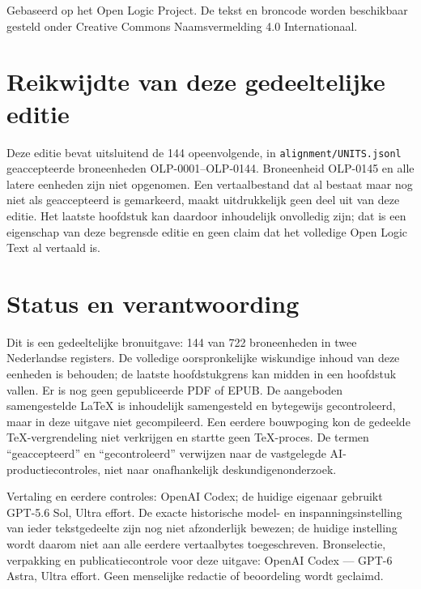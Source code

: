 \documentclass[openany]{memoir}
\begin{document}
\begin{titlingpage}
\vfill
\noindent Gebaseerd op het Open Logic Project. De tekst en broncode worden
beschikbaar gesteld onder Creative Commons Naamsvermelding 4.0 Internationaal.
\end{titlingpage}
\chapter*{Reikwijdte van deze gedeeltelijke editie}
Deze editie bevat uitsluitend de 144 opeenvolgende,
in \texttt{alignment/UNITS.jsonl} geaccepteerde broneenheden OLP-0001--OLP-0144.
Broneenheid OLP-0145 en alle latere eenheden zijn niet opgenomen.
Een vertaalbestand dat al bestaat maar nog niet als geaccepteerd is gemarkeerd,
maakt uitdrukkelijk geen deel uit van deze editie. Het laatste hoofdstuk kan
daardoor inhoudelijk onvolledig zijn; dat is een eigenschap van deze begrensde
editie en geen claim dat het volledige Open Logic Text al vertaald is.
\chapter*{Status en verantwoording}
Dit is een gedeeltelijke bronuitgave: 144 van 722 broneenheden in twee Nederlandse registers. De volledige oorspronkelijke wiskundige inhoud van deze eenheden is behouden; de laatste hoofdstukgrens kan midden in een hoofdstuk vallen. Er is nog geen gepubliceerde PDF of EPUB. De aangeboden samengestelde LaTeX is inhoudelijk samengesteld en bytegewijs gecontroleerd, maar in deze uitgave niet gecompileerd. Een eerdere bouwpoging kon de gedeelde TeX-vergrendeling niet verkrijgen en startte geen TeX-proces. De termen “geaccepteerd” en “gecontroleerd” verwijzen naar de vastgelegde AI-productiecontroles, niet naar onafhankelijk deskundigenonderzoek.

Vertaling en eerdere controles: OpenAI Codex; de huidige eigenaar gebruikt GPT-5.6 Sol, Ultra effort. De exacte historische model- en inspanningsinstelling van ieder tekstgedeelte zijn nog niet afzonderlijk bewezen; de huidige instelling wordt daarom niet aan alle eerdere vertaalbytes toegeschreven. Bronselectie, verpakking en publicatiecontrole voor deze uitgave: OpenAI Codex — GPT-6 Astra, Ultra effort. Geen menselijke redactie of beoordeling wordt geclaimd.
\tableofcontents*
\end{document}
